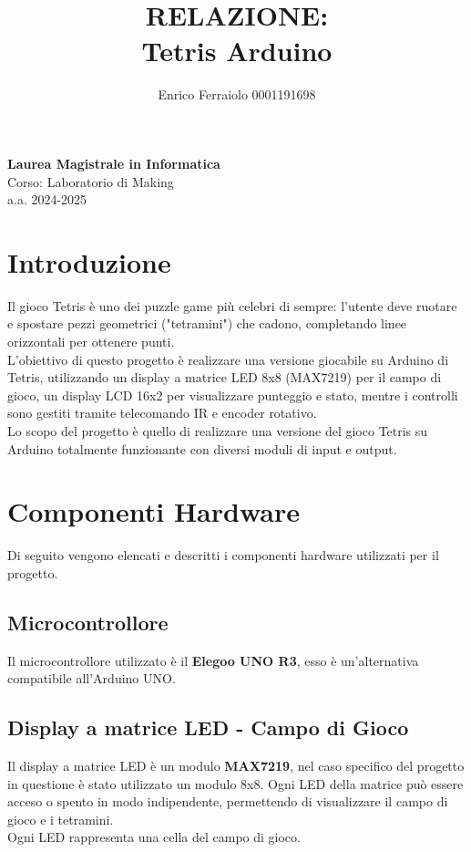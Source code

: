 \documentclass[a4paper, 12pt]{article}
\title{\textbf{RELAZIONE: \\ Tetris Arduino}}
\author{Enrico Ferraiolo 0001191698}
\date{}
\begin{document}
\maketitle

\begin{center}
    \textbf{Laurea Magistrale in Informatica}\\
    \vspace{0.3cm}
    Corso: Laboratorio di Making\\
    a.a. 2024-2025
    \vspace{2cm}
\end{center}

\newpage

\tableofcontents
\newpage

\section{Introduzione}
Il gioco Tetris è uno dei puzzle game più celebri di sempre: l'utente deve ruotare e spostare pezzi geometrici ("tetramini") che cadono, 
completando linee orizzontali per ottenere punti.\\
L'obiettivo di questo progetto è realizzare una versione giocabile su Arduino di Tetris, utilizzando un display a matrice LED 8x8 (MAX7219) 
per il campo di gioco, un display LCD 16x2 per visualizzare punteggio e stato, mentre i controlli sono gestiti tramite telecomando IR e encoder rotativo.\\
Lo scopo del progetto è quello di realizzare una versione del gioco Tetris su Arduino totalmente funzionante con diversi moduli di input e output.\\
\newpage

\section{Componenti Hardware}
Di seguito vengono elencati e descritti i componenti hardware utilizzati per il progetto.

\subsection{Microcontrollore}
Il microcontrollore utilizzato è il \textbf{Elegoo UNO R3}, esso è un'alternativa compatibile all'Arduino UNO.

\subsection{Display a matrice LED - Campo di Gioco}
Il display a matrice LED è un modulo \textbf{MAX7219}, nel caso specifico del progetto in questione è stato utilizzato un modulo 8x8.
Ogni LED della matrice può essere acceso o spento in modo indipendente, permettendo di visualizzare il campo di gioco e i tetramini.\\
Ogni LED rappresenta una cella del campo di gioco.
\end{document}
